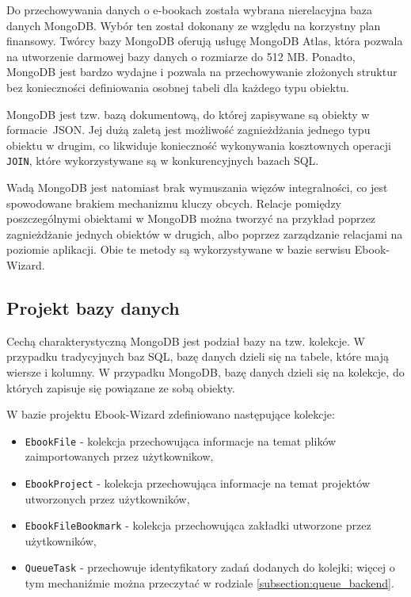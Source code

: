 Do przechowywania danych o e-bookach została wybrana nierelacyjna baza danych MongoDB. Wybór ten został dokonany ze względu na korzystny plan finansowy. Twórcy bazy MongoDB oferują usługę MongoDB Atlas, która pozwala na utworzenie darmowej bazy danych o rozmiarze do 512 MB. Ponadto, MongoDB jest bardzo wydajne i pozwala na przechowywanie złożonych struktur bez konieczności definiowania osobnej tabeli dla każdego typu obiektu. \cite{mongodb_book}

MongoDB jest tzw. bazą dokumentową, do której zapisywane są obiekty w formacie~JSON. Jej dużą zaletą jest możliwość zagnieżdżania jednego typu obiektu w drugim, co likwiduje konieczność wykonywania kosztownych operacji \verb|JOIN|, które wykorzystywane są w konkurencyjnych bazach SQL. \cite{aws_mongodb_vs_sql}

Wadą MongoDB jest natomiast brak wymuszania więzów integralności, co jest spowodowane brakiem mechanizmu kluczy obcych. Relacje pomiędzy poszczególnymi obiektami w MongoDB można tworzyć na przykład poprzez zagnieżdżanie jednych obiektów w drugich, albo poprzez zarządzanie relacjami na poziomie aplikacji. \cite{mongodb_book} Obie te metody są wykorzystywane w bazie serwisu Ebook-Wizard.

\subsection{Projekt bazy danych}

Cechą charakterystyczną MongoDB jest podział bazy na tzw. kolekcje. W przypadku tradycyjnych baz SQL, bazę danych dzieli się na tabele, które mają wiersze i kolumny. W przypadku MongoDB, bazę danych dzieli się na kolekcje, do których zapisuje się powiązane ze sobą obiekty. \cite{aws_mongodb_vs_sql}

W bazie projektu Ebook-Wizard zdefiniowano następujące kolekcje:

\begin{itemize}
    \item \verb|EbookFile| - kolekcja przechowująca informacje na temat plików zaimportowanych przez użytkownikow,
    \item \verb|EbookProject| - kolekcja przechowująca informacje na temat projektów utworzonych przez użytkowników,
    \item \verb|EbookFileBookmark| - kolekcja przechowująca zakładki utworzone przez użytkowników,
    \item \verb|QueueTask| - przechowuje identyfikatory zadań dodanych do kolejki; więcej o tym mechaniźmie można przeczytać w rodziale \ref{subsection:queue_backend}.
\end{itemize}

